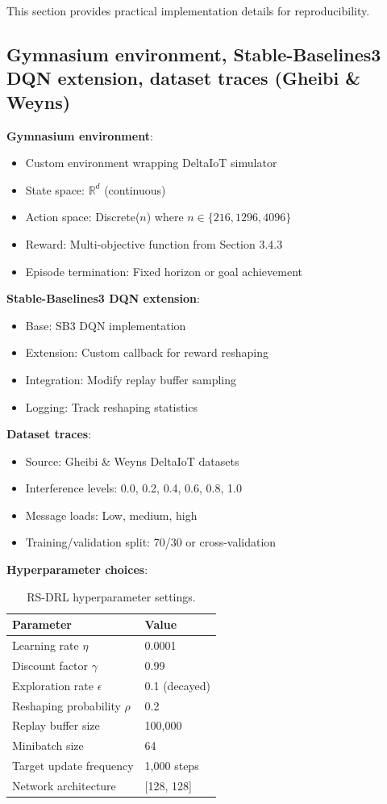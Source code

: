 \documentclass[11pt,a4paper]{article}
\begin{document}
This section provides practical implementation details for reproducibility.

\subsection{Gymnasium environment, Stable-Baselines3 DQN extension, dataset traces (Gheibi \& Weyns)}

\textbf{Gymnasium environment}:
\begin{itemize}
    \item Custom environment wrapping DeltaIoT simulator
    \item State space: $\mathbb{R}^d$ (continuous)
    \item Action space: Discrete($n$) where $n \in \{216, 1296, 4096\}$
    \item Reward: Multi-objective function from Section 3.4.3
    \item Episode termination: Fixed horizon or goal achievement
\end{itemize}

\textbf{Stable-Baselines3 DQN extension}:
\begin{itemize}
    \item Base: SB3 DQN implementation
    \item Extension: Custom callback for reward reshaping
    \item Integration: Modify replay buffer sampling
    \item Logging: Track reshaping statistics
\end{itemize}

\textbf{Dataset traces}:
\begin{itemize}
    \item Source: Gheibi \& Weyns DeltaIoT datasets
    \item Interference levels: 0.0, 0.2, 0.4, 0.6, 0.8, 1.0
    \item Message loads: Low, medium, high
    \item Training/validation split: 70/30 or cross-validation
\end{itemize}

\textbf{Hyperparameter choices}:
\begin{table}[H]
\centering
\begin{tabular}{ll}
\textbf{Parameter} & \textbf{Value} \\
\hline
Learning rate $\eta$ & 0.0001 \\
Discount factor $\gamma$ & 0.99 \\
Exploration rate $\epsilon$ & 0.1 (decayed) \\
Reshaping probability $\rho$ & 0.2 \\
Replay buffer size & 100,000 \\
Minibatch size & 64 \\
Target update frequency & 1,000 steps \\
Network architecture & [128, 128] \\
\end{tabular}
\caption{RS-DRL hyperparameter settings.}
\end{table}
\end{document}
